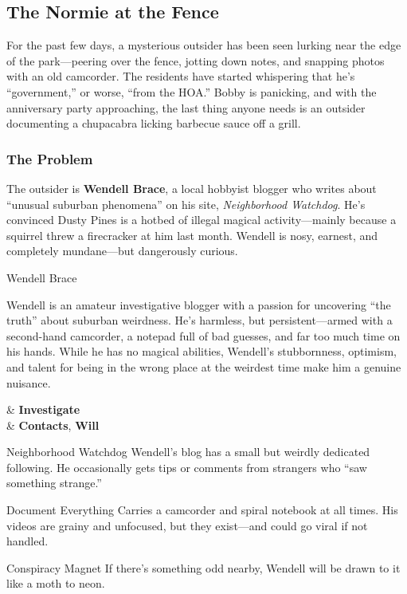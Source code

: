 \subsection{The Normie at the Fence}

For the past few days, a mysterious outsider has been seen lurking near the edge of the park—peering over the fence, jotting down notes, and snapping photos with an old camcorder. The residents have started whispering that he’s “government,” or worse, “from the HOA.” Bobby is panicking, and with the anniversary party approaching, the last thing anyone needs is an outsider documenting a chupacabra licking barbecue sauce off a grill.

\subsubsection{The Problem}
The outsider is \textbf{Wendell Brace}, a local hobbyist blogger who writes about “unusual suburban phenomena” on his site, \emph{Neighborhood Watchdog}. He’s convinced Dusty Pines is a hotbed of illegal magical activity—mainly because a squirrel threw a firecracker at him last month. Wendell is nosy, earnest, and completely mundane—but dangerously curious.

\begin{NPC}[description={Mundane, Nosy, Enthusiastic Blogger}]{Wendell Brace}

    Wendell is an amateur investigative blogger with a passion for uncovering “the truth” about suburban weirdness. He’s harmless, but persistent—armed with a second-hand camcorder, a notepad full of bad guesses, and far too much time on his hands. While he has no magical abilities, Wendell’s stubbornness, optimism, and talent for being in the wrong place at the weirdest time make him a genuine nuisance.

    \vspace{0.5\baselineskip}
    \begin{SkillsBox}
        \Skilled & \textbf{Investigate} \\
        \Novice  & \textbf{Contacts}, \textbf{Will}
    \end{SkillsBox}

    \begin{TraitsBox}
        \item[Neighborhood Watchdog] Wendell’s blog has a small but weirdly dedicated following. He occasionally gets tips or comments from strangers who “saw something strange.”
        \item[Document Everything] Carries a camcorder and spiral notebook at all times. His videos are grainy and unfocused, but they exist—and could go viral if not handled.
        \item[Conspiracy Magnet] If there’s something odd nearby, Wendell will be drawn to it like a moth to neon.
    \end{TraitsBox}

    \DamageBox[%
        totalfatigue=2,%
        totalmild=1,totalmoderate=0,totalsevere=0,%
    ]
\end{NPC}

